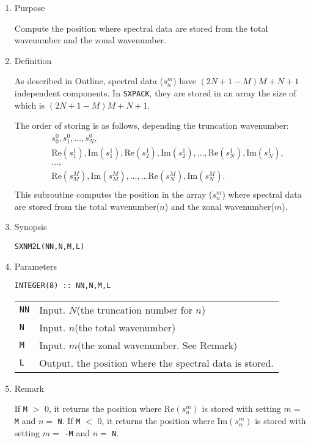 \documentclass[a4paper]{scrartcl}
\begin{document}
\begin{enumerate}

\item Purpose 

Compute the position where spectral data are stored
from the total wavenumber and the zonal wavenumber.

\item Definition

As described in Outline, 
spectral data ($s^m_n$) have $(2N+1-M)M+N+1$ independent
components. In \texttt{SXPACK}, they are stored in an array the
size of which is $(2N+1-M)M+N+1$.

The order of storing is as follows, depending the truncation wavenumber:
\begin{eqnarray*}
&& s^0_0, s^0_1, \ldots, s^0_N,\\
&& \mbox{Re}(s^1_1), \mbox{Im}(s^1_1),
\mbox{Re}(s^1_2), \mbox{Im}(s^1_2), \ldots, 
\mbox{Re}(s^1_N), \mbox{Im}(s^1_N),\\
&&\ldots,\\
&& \mbox{Re}(s^M_M), \mbox{Im}(s^M_M), \ldots,
\ldots \mbox{Re}(s^M_N), \mbox{Im}(s^M_N).\\
\end{eqnarray*}
This subroutine computes 
the position in the array ($s^m_n$)
where spectral data are stored
from the total wavenumber($n$) and the zonal wavenumber($m$).

\item Synopsis 
    
\texttt{SXNM2L(NN,N,M,L)}
  
\item Parameters
\begin{verbatim}
INTEGER(8) :: NN,N,M,L  
\end{verbatim}    

\begin{tabular}{ll}
\texttt{NN} & Input. $N$(the truncation number for $n$)\\
\texttt{N} & Input. $n$(the total wavenumber)\\
\texttt{M} & Input. $m$(the zonal wavenumber. See Remark)\\
\texttt{L} & Output. the position where the spectral
data is stored.
\end{tabular}

\item Remark

If \texttt{M} $>$ 0, it returns the position where
$\mbox{Re}(s^m_n)$ is stored with setting 
$m=$ \texttt{M} and $n=$ \texttt{N}.
If \texttt{M} $<$ 0, it returns the position where
$\mbox{Im}(s^m_n)$ is stored with setting 
$m=$ \texttt{-M} and $n=$ \texttt{N}.

\end{enumerate}
\end{document}

